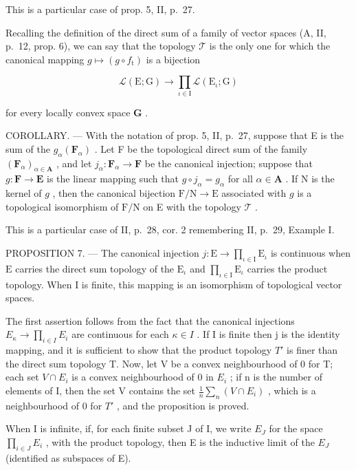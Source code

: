 This is a particular case of prop. 5, II, p.~27.

Recalling the definition of the direct sum of a family of vector spaces (A, II, p.~12, prop. 6), we can say that the topology \(\mathcal{T}\) is the only one for which the canonical mapping \(g \mapsto (g \circ f_{\mathrm{t}})\) is a bijection

\[
\mathcal {L} (\mathrm{E}; \mathrm{G}) \rightarrow \prod_ {\iota \in \mathrm{I}} \mathcal {L} (\mathrm{E} _ {\iota}; \mathrm{G})\tag{1}
\]

for every locally convex space \(\mathbf{G}\) .

COROLLARY. --- With the notation of prop. 5, II, p.~27, suppose that E is the sum of the \(g_{\alpha}(\mathbf{F}_{\alpha})\) . Let F be the topological direct sum of the family \((\mathbf{F}_{\alpha})_{\alpha \in \mathbf{A}}\) , and let \(j_{\alpha}: \mathbf{F}_{\alpha} \to \mathbf{F}\) be the canonical injection; suppose that \(g: \mathbf{F} \to \mathbf{E}\) is the linear mapping such that \(g \circ j_{\alpha} = g_{\alpha}\) for all \(\alpha \in \mathbf{A}\) . If N is the kernel of \(g\) , then the canonical bijection \(\mathrm{F/N} \to \mathrm{E}\) associated with \(g\) is a topological isomorphism of \(\mathrm{F/N}\) on E with the topology \(\mathcal{T}\) .

This is a particular case of II, p.~28, cor. 2 remembering II, p.~29, Example I.

PROPOSITION 7. --- The canonical injection \(j: \mathrm{E} \to \prod_{\iota \in \mathrm{I}} \mathrm{E}_{\iota}\) is continuous when \(\mathrm{E}\) carries the direct sum topology of the \(\mathrm{E}_{\iota}\) and \(\prod_{\iota \in \mathrm{I}} \mathrm{E}_{\iota}\) carries the product topology. When \(\mathrm{I}\) is finite, this mapping is an isomorphism of topological vector spaces.

The first assertion follows from the fact that the canonical injections \(E_{\kappa} \to \prod_{i \in I} E_{i}\) are continuous for each \(\kappa \in I\) . If I is finite then j is the identity mapping, and it is sufficient to show that the product topology \(T'\) is finer than the direct sum topology T. Now, let V be a convex neighbourhood of 0 for T; each set \(V \cap E_{i}\) is a convex neighbourhood of 0 in \(E_{i}\) ; if n is the number of elements of I, then the set V contains the set \(\frac{1}{n} \sum_{n} (V \cap E_{i})\) , which is a neighbourhood of 0 for \(T'\) , and the proposition is proved.

When I is infinite, if, for each finite subset J of I, we write \(E_{J}\) for the space \(\prod_{i\in J}E_{i}\) , with the product topology, then E is the inductive limit of the \(E_{J}\) (identified as subspaces of E).

